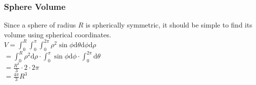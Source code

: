 \subsubsection{Sphere Volume}
\noindent
Since a sphere of radius $R$ is spherically symmetric, it should be simple to find its volume using spherical coordinates.\\
\indent
$V=\int_{0}^{R}{\int_{0}^{\pi}{\int_{0}^{2\pi}{\rho^2\sin{\phi}\mathrm{d}\theta}\mathrm{d}\phi}\mathrm{d}\rho}$\\
\indent
$=\int_{0}^{R}{\rho^2\mathrm{d}\rho}\cdot\int_{0}^{\pi}{\sin{\phi}\mathrm{d}\phi}\cdot\int_{0}^{2\pi}{\mathrm{d}\theta}$\\
\indent
$=\frac{R^3}{3}\cdot2\cdot2\pi$\\
\indent
$=\frac{4\pi}{3}R^3$\\